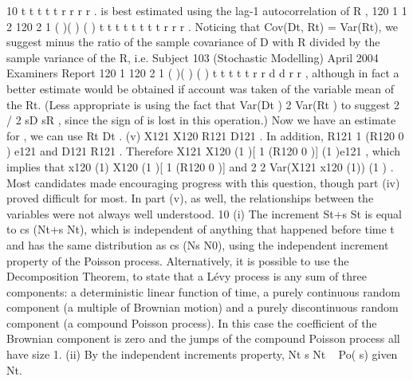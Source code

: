\documentclass[a4paper,12pt]{article}
\begin{document}
10 t t t t t r r r r .
is best estimated using the lag-1 autocorrelation of R ,
120
1 1
2
120
2
1
( )( )
( )
t t t t
t
t t
t
r r
r
.
Noticing that Cov(Dt, Rt) = Var(Rt), we suggest minus the ratio of the
sample covariance of D with R divided by the sample variance of the R, i.e.
Subject 103 (Stochastic Modelling) April 2004 Examiners Report
120
1
120
2
1
( )( )
( )
t t
t
t
t
r r d d
r r
, although in fact a better estimate would be obtained if account was taken of the variable mean of the Rt.
(Less appropriate is using the fact that Var(Dt ) 2 Var(Rt ) to suggest 2 / 2 sD sR , since the sign of is lost in this operation.)
Now we have an estimate for , we can use Rt Dt .
(v) X121 X120 R121 D121 . In addition, R121 1 (R120 0 ) e121 and
D121 R121 .
Therefore X121 X120 (1 )[ 1 (R120 0 )] (1 )e121 , which
implies that x120 (1) X120 (1 )[ 1 (R120 0 )]
and 2 2
Var(X121 x120 (1)) (1 ) .
Most candidates made encouraging progress with this question, though part (iv) proved difficult for most. In part (v), as well, the relationships between the variables were not
always well understood.
10 (i) The increment St+s St is equal to cs (Nt+s Nt), which is independent of
anything that happened before time t and has the same distribution as
cs (Ns N0), using the independent increment property of the Poisson
process.
Alternatively, it is possible to use the Decomposition Theorem, to state that a Lévy process is any sum of three components: a deterministic linear function of time, a purely continuous random component (a multiple of Brownian
motion) and a purely discontinuous random component (a compound Poisson
process). In this case the coefficient of the Brownian component is zero and
the jumps of the compound Poisson process all have size 1.
(ii) By the independent increments property, Nt s Nt ~ Po( s) given Nt.
\end{document}
